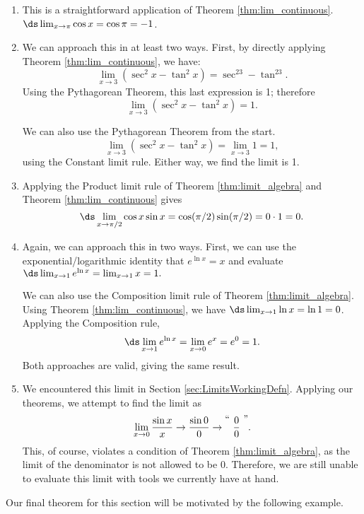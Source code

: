 \begin{solution}
{
\begin{enumerate}
\item		This is a straightforward application of Theorem \ref{thm:lim_continuous}. $\ds \lim_{x\to \pi} \cos x = \cos \pi = -1$.
\item		We can approach this in at least two ways. First, by directly applying Theorem \ref{thm:lim_continuous}, we have:
				$$\lim_{x\to 3} (\sec^2x - \tan^2 x) = \sec^23-\tan^23.$$ Using the Pythagorean Theorem, this last expression is 1; therefore $$\lim_{x\to 3} (\sec^2x - \tan^2 x) = 1.$$
				
				We can also use the Pythagorean Theorem from the start. $$\lim_{x\to 3} (\sec^2x - \tan^2 x) = \lim_{x\to 3} 1 = 1,$$ using the Constant limit rule. Either way, we find the limit is 1.
				
\item		Applying the Product limit rule of Theorem \ref{thm:limit_algebra} and Theorem \ref{thm:lim_continuous} gives $$\ds \lim_{x\to \pi/2} \cos x\sin x = \cos (\pi/2)\sin(\pi/2) = 0\cdot 1 = 0.$$

\item		Again, we can approach this in two ways. First, we can use the exponential/logarithmic identity that $e^{\ln x} = x$ and evaluate $\ds \lim_{x\to 1} e^{\ln x} = \lim_{x\to 1} x = 1.$ 

We can also use the Composition limit rule of Theorem \ref{thm:limit_algebra}. Using Theorem \ref{thm:lim_continuous}, we have $\ds \lim_{x\to 1}\ln x = \ln 1 = 0$. Applying the Composition rule, $$\ds \lim_{x\to 1} e^{\ln x} = \lim_{x\to 0} e^x = e^0 = 1.$$ Both approaches are valid, giving the same result.

\item		We encountered this limit in Section \ref{sec:LimitsWorkingDefn}. Applying our theorems, we attempt to find the limit as $$\lim_{x\to 0}\frac{\sin x}{x}\rightarrow \frac{\sin 0}{0} \rightarrow \raisebox{8pt}{\text{``\ }}\frac{0}{0}\raisebox{8pt}{\text{\ ''}}.$$ This, of course, violates a condition of Theorem \ref{thm:limit_algebra}, as the limit of the denominator is not allowed to be 0. Therefore, we are still unable to evaluate this limit with tools we currently have at hand.
\end{enumerate}
}
\end{solution}


Our final theorem for this section will be motivated by the following example.\\


